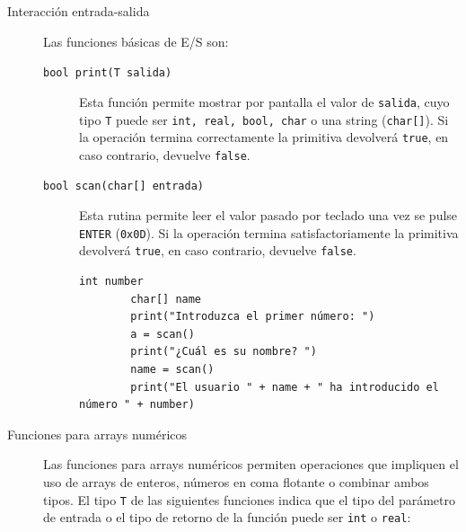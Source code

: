 \documentclass[11pt, english]{article}
\begin{document}
\begin{description} 
	\item [Interacción entrada-salida] Las funciones básicas de E/S son: 
	\begin{description}
		
		\item[\texttt{bool print(T salida)}] Esta función permite mostrar por pantalla el valor de \texttt{salida}, cuyo tipo \texttt{T} puede ser \texttt{int, real, bool, char} o una string (\texttt{char[]}). Si la operación termina correctamente la primitiva devolverá \texttt{true}, en caso contrario, devuelve \texttt{false}.
		\item[\texttt{bool scan(char[] entrada)}] Esta rutina permite leer el valor pasado por teclado una vez se pulse \texttt{ENTER} (\texttt{0x0D}). Si la operación termina satisfactoriamente la primitiva devolverá \texttt{true}, en caso contrario, devuelve \texttt{false}.
	
		\begin{lstlisting}[caption=Ejemplo de uso de la función \texttt{print()} y \texttt{scan()}]
		int number
		char[] name
		print("Introduzca el primer número: ")
		a = scan()
		print("¿Cuál es su nombre? ")
		name = scan()
		print("El usuario " + name + " ha introducido el número " + number)
		\end{lstlisting}
	\end{description}


	\item [Funciones para arrays numéricos] Las funciones para arrays numéricos permiten operaciones que impliquen el uso de arrays de enteros, números en coma flotante o combinar ambos tipos. El tipo \texttt{T} de las siguientes funciones indica que el tipo del parámetro de entrada o el tipo de retorno de la función puede ser \texttt{int} o \texttt{real}:
	

\end{description}
\end{document}
